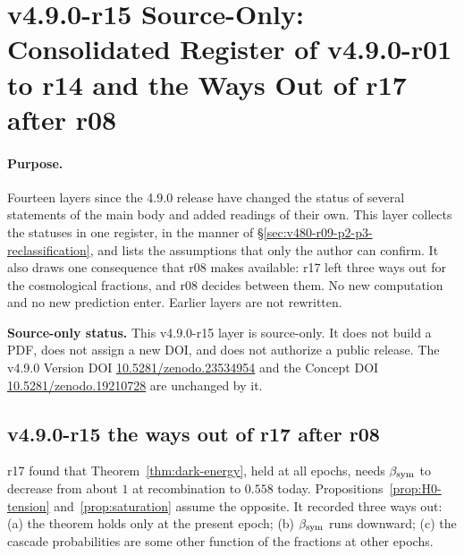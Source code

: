 \clearpage
\section*{v4.9.0-r15 Source-Only: Consolidated Register of v4.9.0-r01 to r14 and the Ways Out of r17 after r08}
\label{sec:v490-r15-consolidated-register}

\paragraph{Purpose.}
Fourteen layers since the 4.9.0 release have changed the status of several statements of the main body and added
readings of their own.  This layer collects the statuses in one register, in the manner of
\S\ref{sec:v480-r09-p2-p3-reclassification}, and lists the assumptions that only the author can confirm.  It also draws one
consequence that r08 makes available: r17 left three ways out for the cosmological fractions, and r08 decides between
them.  No new computation and no new prediction enter.  Earlier layers are not rewritten.

\noindent\textbf{Source-only status.}
This v4.9.0-r15 layer is source-only.  It does not build a PDF, does not assign a new DOI,
and does not authorize a public release.  The v4.9.0 Version DOI
\href{https://doi.org/10.5281/zenodo.23534954}{10.5281/zenodo.23534954} and the Concept DOI
\href{https://doi.org/10.5281/zenodo.19210728}{10.5281/zenodo.19210728} are unchanged by it.

\subsection*{v4.9.0-r15 the ways out of r17 after r08}
\label{subsec:v490-r15-r17-ways}

r17 found that Theorem~\ref{thm:dark-energy}, held at all epochs, needs \(\beta_{\mathrm{sym}}\) to decrease from about \(1\) at
recombination to \(0.558\) today.  Propositions~\ref{prop:H0-tension} and~\ref{prop:saturation} assume the opposite.  It
recorded three ways out: (a) the theorem holds only at the present epoch; (b) \(\beta_{\mathrm{sym}}\) runs downward; (c) the cascade
probabilities are some other function of the fractions at other epochs.

